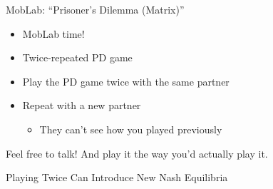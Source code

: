 
\begin{frame}{MobLab: ``Prisoner's Dilemma (Matrix)''}
\begin{itemize}
    \item MobLab time!
    \item Twice-repeated PD game
    \item Play the PD game twice with the same partner
    \item Repeat with a new partner
    \begin{itemize}
        \item They can't see how you played previously
    \end{itemize}
\end{itemize}
\vfill
\centering
Feel free to talk! And play it the way you'd actually play it.
\vspace{-0.2in}
\end{frame}


\begin{frame}[standout]
Playing Twice Can Introduce New Nash Equilibria
\end{frame}

